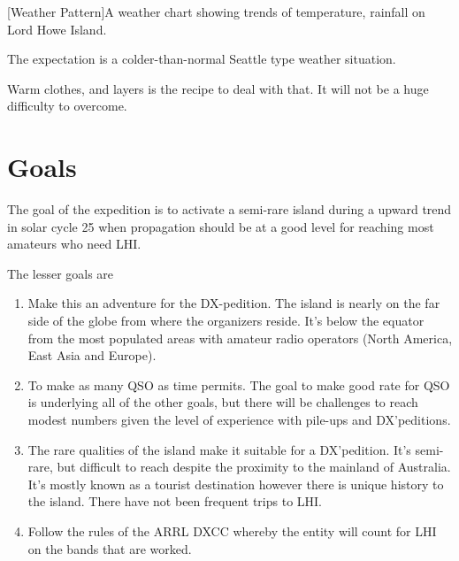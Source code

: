 \documentclass[11pt]{article}
\begin{document}
\vskip2mm
\noindent%
\begin{minipage}{\linewidth}%
\captionsetup{width=0.8\linewidth}
[Weather Pattern]{A weather chart showing trends of temperature,
rainfall on Lord Howe Island.}
\label{rain}
\end{minipage}
\vskip3mm

The expectation is a colder-than-normal Seattle type weather situation.
\par
Warm clothes, and layers is the recipe to deal with that.  It will not
be a huge difficulty to overcome.

\section{Goals}

The goal of the expedition is to activate a semi-rare island
during a upward trend in solar cycle 25 when propagation should be
at a good level for reaching most amateurs who need LHI.
\par
The lesser goals are
\begin{enumerate}
\item Make this an adventure for the DX-pedition.  The island is
nearly on the far side of the globe from where the organizers reside.
It's below the equator from the most populated areas with amateur
radio operators (North America, East Asia and Europe).
\item To make as many QSO as time permits.  The
goal to make good rate for QSO is underlying all of the
other goals, but there will be challenges to reach
modest numbers given the level of experience with 
pile-ups and DX'peditions.
\item The rare qualities of the island make it suitable
for a DX'pedition.  It's semi-rare, but difficult to
reach despite the proximity to the mainland of
Australia.  It's mostly known as a tourist destination
however there is unique history to the island.  There
have not been frequent trips to LHI.
\item Follow the rules of the ARRL DXCC whereby
the entity will count for LHI on
the bands that are worked.
\end{enumerate}
\end{document}
